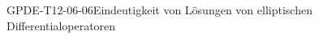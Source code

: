 
\begin{KORO}{GPDE-T12-06-06}{Eindeutigkeit von Lösungen von elliptischen Differentialoperatoren}
\end{KORO}
